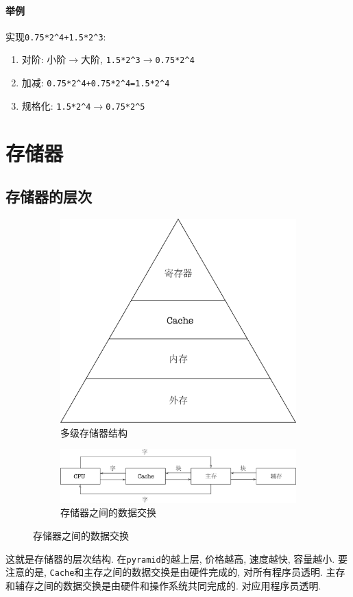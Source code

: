 \subsubsection{举例}
实现\verb|0.75*2^4+1.5*2^3|:
\begin{enumerate}
\item 对阶: 小阶$ \rightarrow $大阶, \verb|1.5*2^3|$ \rightarrow $\verb|0.75*2^4|
\item 加减: \verb|0.75*2^4+0.75*2^4=1.5*2^4|
\item 规格化: \verb|1.5*2^4|$ \rightarrow $\verb|0.75*2^5|
\end{enumerate}
\chapter{存储器}
\section{存储器的层次}
\begin{figure}[H]
\centering
\begin{subfigure}{.48\textwidth}
\centering
\includegraphics[scale=.3]{img/figure11.pdf}
\caption{多级存储器结构}
\end{subfigure}
\begin{subfigure}{.48\textwidth}
\centering
\flushleft
\includegraphics[scale=.3]{img/figure12.pdf}
\caption{存储器之间的数据交换}
\end{subfigure}
\end{figure}
这就是存储器的层次结构. 在\verb|pyramid|的越上层, 价格越高, 速度越快, 容量越小. 要注意的是, \verb|Cache|和主存之间的数据交换是由硬件完成的, 对所有程序员透明. 主存和辅存之间的数据交换是由硬件和操作系统共同完成的. 对应用程序员透明.
